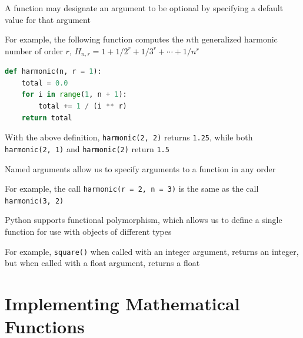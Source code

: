 \documentclass[8pt,a4paper,compress]{beamer}
\begin{document}
\begin{frame}[fragile]
\pause

A function may designate an argument to be optional by specifying a default value for that argument

\pause
\bigskip

For example, the following function computes the $n$th generalized harmonic number of order $r$, $H_{n,r}=1+1/2^r+1/3^r+\cdots+1/n^r$

\smallskip

\begin{lstlisting}[language=Python,style=focusin]
def harmonic(n, r = 1):
    total = 0.0
    for i in range(1, n + 1):
        total += 1 / (i ** r)
    return total
\end{lstlisting}

\smallskip

With the above definition, \lstinline{harmonic(2, 2)} returns \lstinline{1.25}, while both \lstinline{harmonic(2, 1)} and \lstinline{harmonic(2)} return \lstinline{1.5}

\pause
\bigskip

Named arguments allow us to specify arguments to a function in any order

\pause
\bigskip

For example, the call \lstinline{harmonic(r = 2, n = 3)} is the same as the call \lstinline{harmonic(3, 2)}

\pause
\bigskip

Python supports functional polymorphism, which allows us to define a single function for use with objects of different types

\pause
\bigskip

For example, \lstinline{square()} when called with an integer argument, returns an integer, but when called with a float argument, returns a float
\end{frame}

\section{Implementing Mathematical Functions}
\end{document}
